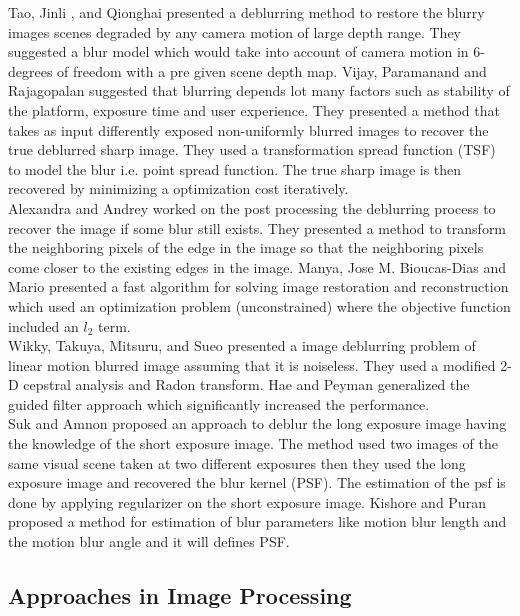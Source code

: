 \documentclass{article}
\begin{document}
Tao, Jinli , and Qionghai \cite{10} presented a deblurring method to restore the blurry images scenes degraded by any camera motion of large depth range. They suggested a blur model which would take into account of camera motion in 6-degrees of freedom with a pre given scene depth map. Vijay, Paramanand and Rajagopalan \cite{11} suggested that blurring depends lot many factors such as stability of the platform, exposure time and user experience. They presented a method that takes as input differently exposed non-uniformly blurred images to recover the true deblurred sharp image. They used a transformation spread function (TSF) to model the blur i.e. point spread function. The true sharp image is then recovered by minimizing a optimization cost iteratively. \\

Alexandra and Andrey \cite{12} worked on the post processing the deblurring process to recover the image if some blur still exists. They presented a method to transform the neighboring pixels of the edge in the image so that the neighboring pixels come closer to the existing edges in the image. Manya, Jose M. Bioucas-Dias and Mario \cite{13} presented a fast algorithm for solving image restoration and reconstruction which used an optimization problem (unconstrained) where the objective function included an $l_2$ term. \\

Wikky, Takuya, Mitsuru, and Sueo \cite{14} presented a image deblurring problem of linear motion blurred image assuming that it is noiseless. They used a modified 2-D cepstral analysis and Radon transform. Hae and Peyman \cite{15}  generalized the guided filter approach which significantly increased the performance. \\

Suk and Amnon \cite{16} proposed an approach to deblur the long exposure image having the knowledge of the short exposure image. The method used two images of the same visual scene taken at two different exposures then they used the long exposure image and recovered the blur kernel (PSF). The estimation of the psf is done by applying regularizer on the short exposure image. Kishore and Puran \cite{17} proposed a method for estimation of blur parameters like motion blur length and the motion blur angle and it will defines PSF.  

\subsection{Approaches in Image Processing}
\end{document}
